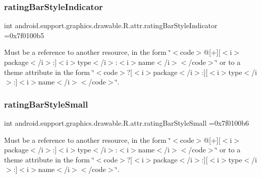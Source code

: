 \subsubsection{\texorpdfstring{rating\+Bar\+Style\+Indicator}{ratingBarStyleIndicator}}
{\footnotesize\ttfamily int android.\+support.\+graphics.\+drawable.\+R.\+attr.\+rating\+Bar\+Style\+Indicator =0x7f0100b5\hspace{0.3cm}{\ttfamily [static]}}

Must be a reference to another resource, in the form \char`\"{}$<$code$>$@\mbox{[}+\mbox{]}\mbox{[}$<$i$>$package$<$/i$>$\+:\mbox{]}$<$i$>$type$<$/i$>$\+:$<$i$>$name$<$/i$>$$<$/code$>$\char`\"{} or to a theme attribute in the form \char`\"{}$<$code$>$?\mbox{[}$<$i$>$package$<$/i$>$\+:\mbox{]}\mbox{[}$<$i$>$type$<$/i$>$\+:\mbox{]}$<$i$>$name$<$/i$>$$<$/code$>$\char`\"{}. \mbox{\label{classandroid_1_1support_1_1graphics_1_1drawable_1_1R_1_1attr_a9a377772e9e0e2fb84f877c76f9fb7b0}} 
\subsubsection{\texorpdfstring{rating\+Bar\+Style\+Small}{ratingBarStyleSmall}}
{\footnotesize\ttfamily int android.\+support.\+graphics.\+drawable.\+R.\+attr.\+rating\+Bar\+Style\+Small =0x7f0100b6\hspace{0.3cm}{\ttfamily [static]}}

Must be a reference to another resource, in the form \char`\"{}$<$code$>$@\mbox{[}+\mbox{]}\mbox{[}$<$i$>$package$<$/i$>$\+:\mbox{]}$<$i$>$type$<$/i$>$\+:$<$i$>$name$<$/i$>$$<$/code$>$\char`\"{} or to a theme attribute in the form \char`\"{}$<$code$>$?\mbox{[}$<$i$>$package$<$/i$>$\+:\mbox{]}\mbox{[}$<$i$>$type$<$/i$>$\+:\mbox{]}$<$i$>$name$<$/i$>$$<$/code$>$\char`\"{}. \mbox{\label{classandroid_1_1support_1_1graphics_1_1drawable_1_1R_1_1attr_a96375d50fa728ae2213421f35b88cd9c}} 
